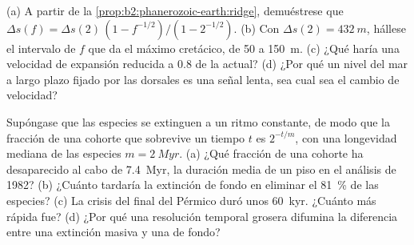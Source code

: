 \begin{exercise}[$\star\star\star$]\label{exo:b2:phanerozoic-earth:11}
(a) A partir de la \cref{prop:b2:phanerozoic-earth:ridge}, demuéstrese que $\Delta s(f) = \Delta s(2)\,(1 -
f^{-1/2})/(1 - 2^{-1/2})$. (b) Con $\Delta s(2) = \qty{432}{m}$, hállese el intervalo de $f$ que
da el máximo cretácico, de 50 a \qty{150}{m}. (c) ¿Qué haría una velocidad de expansión reducida a 0.8 de
la actual? (d) ¿Por qué un nivel del mar a largo plazo fijado por las dorsales es una señal lenta, sea cual sea el cambio de
velocidad?
\end{exercise}

\begin{exercise}[$\star\star\star$]\label{exo:b2:phanerozoic-earth:12}
Supóngase que las especies se extinguen a un ritmo constante, de modo que la fracción de una cohorte que sobrevive un tiempo
$t$ es $2^{-t/m}$, con una longevidad mediana de las especies $m = \qty{2}{Myr}$. (a) ¿Qué fracción de una
cohorte ha desaparecido al cabo de \qty{7.4}{Myr}, la duración media de un piso en el análisis de 1982? (b) ¿Cuánto
tardaría la extinción de fondo en eliminar el \qty{81}{\percent} de las especies? (c) La crisis del final del Pérmico
duró unos \qty{60}{kyr}. ¿Cuánto más rápida fue? (d) ¿Por qué una resolución temporal grosera
difumina la diferencia entre una extinción masiva y una de fondo?
\end{exercise}

